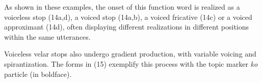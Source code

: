 







As shown in these examples, the onset of this function word is realized as a voiceless stop (14a,d), a voiced stop (14a,b), a voiced fricative (14c) or a voiced approximant (14d), often displaying different realizations in different positions within the same utterances.

Voiceless velar stops also undergo gradient production, with variable voicing and spirantization. The forms in (15) exemplify this process with the topic marker \textit{ko} particle (in boldface).










